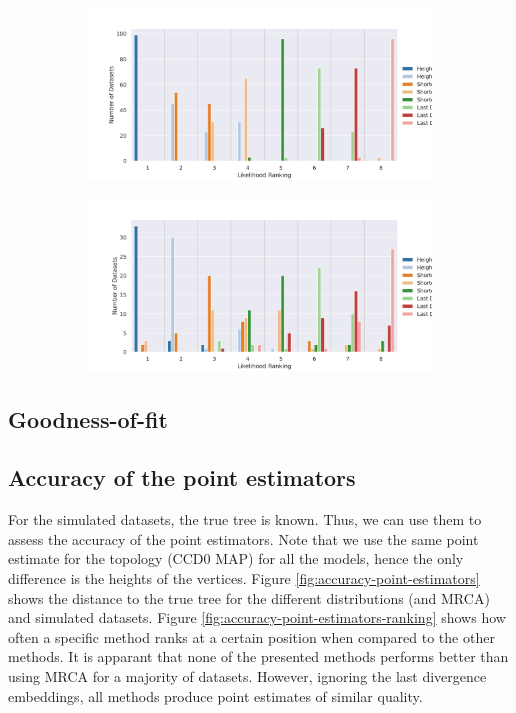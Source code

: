 \documentclass[10pt,letterpaper]{article}
\begin{document}
\begin{figure}[h!]
	\begin{subfigure}[b]{0.45\textwidth}
		\centering
		\includegraphics[width=\textwidth]{figures/yule-400-ccd1-likelihood-ranking.png}
	\end{subfigure}
	\begin{subfigure}[b]{0.45\textwidth}
		\centering
		\includegraphics[width=\textwidth]{figures/bio-ccd1-likelihood-ranking.png}
	\end{subfigure}
	
	\label{fig:data-likelihood-ranking}
\end{figure}

\subsection*{Goodness-of-fit}



\subsection*{Accuracy of the point estimators}

For the simulated datasets, the true tree is known. Thus, we can use them to assess the accuracy of the point estimators. Note that we use the same point estimate for the topology (CCD0 MAP) for all the models, hence the only difference is the heights of the vertices. Figure \ref{fig:accuracy-point-estimators} shows the distance to the true tree for the different distributions (and MRCA) and simulated datasets. Figure \ref{fig:accuracy-point-estimators-ranking} shows how often a specific method ranks at a certain position when compared to the other methods. It is apparant that none of the presented methods performs better than using MRCA for a majority of datasets. However, ignoring the last divergence embeddings, all methods produce point estimates of similar quality.
\end{document}
